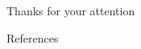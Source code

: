 \documentclass[10pt]{beamer}
\begin{document}

\begin{frame}

\begin{center}
\LARGE
Thanks for your attention
\end{center}

\end{frame}


\begin{frame}[allowframebreaks]{References}




\end{frame}
\end{document}
